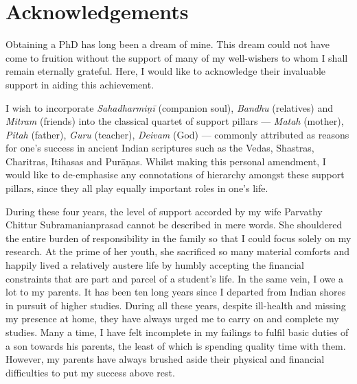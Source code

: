 
\chapter*{Acknowledgements}
\vspace*{-12mm}

Obtaining a PhD has long been a dream of mine. This dream could not have come to
fruition without the support of many of my well-wishers to whom I shall remain
eternally grateful. Here, I would like to acknowledge their invaluable support
in aiding this achievement.

I wish to incorporate \emph{Sahadharmiṇī} (companion soul), \emph{Bandhu}
(relatives) and \emph{Mitram} (friends) into the classical quartet of support
pillars --- \emph{Matah} (mother), \emph{Pitah} (father), \emph{Guru} (teacher),
\emph{Deivam} (God) --- commonly attributed as reasons for one's success in
ancient Indian scriptures such as the Vedas, Shastras, Charitras,  Itihasas and
Purāṇas. Whilst making this personal amendment, I would like to de-emphasise any
connotations of hierarchy amongst these support pillars, since they all play
equally important roles in one's life.

During these four years, the level of support accorded by my wife Parvathy
Chittur Subramanianprasad cannot be described in mere words. She shouldered the
entire burden of responsibility in the family so that I could focus solely on my
research. At the prime of her youth, she sacrificed so many material comforts
and happily lived a relatively austere life by humbly accepting the financial
constraints that are part and parcel of a student's life. In the same vein, I
owe a lot to my parents. It has been ten long years since I departed from Indian
shores in pursuit of higher studies. During all these years, despite ill-health
and missing my presence at home, they have always urged me to carry on and
complete my studies. Many a time, I have felt incomplete in my failings to
fulfil basic duties of a son towards his parents, the least of which is spending
quality time with them. However, my parents have always brushed aside their
physical and financial difficulties to put my success above rest.

